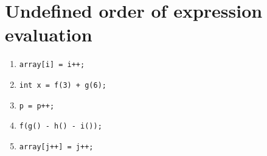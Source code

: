\documentclass{article}
\begin{document}
 \section*{Undefined order of expression evaluation}
 \begin{enumerate}
  \item \texttt{array[i] = i++;} 
  \item \texttt{int x = f(3) + g(6); }
  \item \texttt{p = p++; }
  \item \texttt{f(g() - h() - i());}
  \item \texttt{array[j++] = j++;}
 \end{enumerate}
\end{document}

